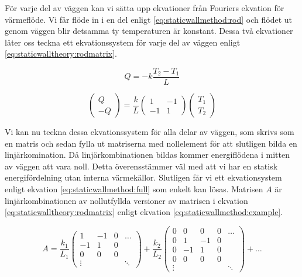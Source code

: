 För varje del av väggen kan vi sätta upp ekvationer från Fouriers ekvation
för värmeflöde. Vi får flöde in i en del enligt \eqref{eq:staticwallmethod:rod} och
flödet ut genom väggen blir detsamma ty temperaturen är konstant. Dessa två
ekvationer låter oss teckna ett ekvationssystem för varje del av väggen
enligt \eqref{eq:staticwalltheory:rodmatrix}. \cite{lewis04}

\begin{equation}
\label{eq:staticwallmethod:rod}
Q = -k\frac{T_{2}-T_{1}}{L}
\end{equation}


\begin{equation}
\label{eq:staticwalltheory:rodmatrix}
\begin{pmatrix}
Q \\
-Q
\end{pmatrix} = 
\frac{k}{L}\begin{pmatrix}
1 & -1 \\
-1 & 1
\end{pmatrix}
\begin{pmatrix}
T_1 \\
T_2
\end{pmatrix}
\end{equation}

\noindent
Vi kan nu teckna dessa ekvationssystem för alla delar av väggen, som skrivs som 
en matris och sedan fylla ut matriserna med nollelement för att slutligen bilda 
en linjärkomination.
Då linjärkombinationen bildas kommer energiflödena i mitten av väggen att
vara noll. Detta överensstämmer väl med att vi har en statisk energifördelning
utan interna värmekällor.
Slutligen får vi ett ekvationsystem enligt ekvation
\eqref{eq:staticwallmethod:full} som enkelt kan lösas.
Matrisen $A$ är linjärkombinationen av nollutfyllda versioner av matrisen i ekvation
\eqref{eq:staticwalltheory:rodmatrix} enligt ekvation
\eqref{eq:staticwallmethod:example}.

\begin{equation}
\label{eq:staticwallmethod:example}
A = \frac{k_1}{L_1}
\begin{pmatrix}
1 & -1 & 0 &  \dots \\
-1 & 1 & 0 &   \\
0 & 0 & 0 &  \\
\vdots & & & \ddots
\end{pmatrix}
+
\frac{k_2}{L_2}
\begin{pmatrix}
0 & 0 & 0 & 0 & \dots \\
0 & 1 & -1 & 0 &  \\
0 & -1 & 1 & 0 & \\
0 & 0 & 0 & 0 & \\
\vdots & & & & \ddots
\end{pmatrix} + \dots
\end{equation}

